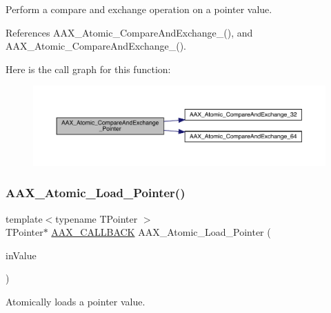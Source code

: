Perform a compare and exchange operation on a pointer value. 



References A\+A\+X\+\_\+\+Atomic\+\_\+\+Compare\+And\+Exchange\+\_(), and A\+A\+X\+\_\+\+Atomic\+\_\+\+Compare\+And\+Exchange\+\_().

Here is the call graph for this function\+:
\nopagebreak
\begin{figure}[H]
\begin{center}
\leavevmode
\includegraphics[width=350pt]{a00398_ab1c7611e7c95fd61900b8e5a44c36e63_cgraph}
\end{center}
\end{figure}
\mbox{\label{a00398_af4fc59eed399acba13a88ca2d46cad92}} 
\subsubsection{\texorpdfstring{AAX\_Atomic\_Load\_Pointer()}{AAX\_Atomic\_Load\_Pointer()}}
{\footnotesize\ttfamily template$<$typename T\+Pointer $>$ \\
T\+Pointer$\ast$ \mbox{\hyperlink{a00392_aaa22112139aa627574b1ef562f579d43}{A\+A\+X\+\_\+\+C\+A\+L\+L\+B\+A\+CK}} A\+A\+X\+\_\+\+Atomic\+\_\+\+Load\+\_\+\+Pointer (\begin{DoxyParamCaption}\item[{T\+Pointer const $\ast$const volatile $\ast$}]{in\+Value }\end{DoxyParamCaption})}



Atomically loads a pointer value. 

